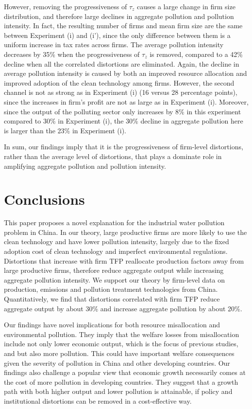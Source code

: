 \documentclass[AEJ]{AEA}
\begin{document}
However, removing the progressiveness of $\tau_z$ causes a large change in firm size distribution, and therefore large declines in aggregate pollution and pollution intensity. In fact, the resulting number of firms and mean firm size are the same between Experiment (i) and (i'), since the only difference between them is a uniform increase in tax rates across firms. The average pollution intensity decreases by 35\% when the progressiveness of $\tau_z$ is removed, compared to a 42\% decline when all the correlated distortions are eliminated. Again, the decline in average pollution intensity is caused by both an improved resource allocation and improved adoption of the clean technology among firms. However, the second channel is not as strong as in Experiment (i) (16 versus 28 percentage points), since the increases in firm's profit are not as large as in Experiment (i). Moreover, since the output of the polluting sector only increases by 8\% in this experiment compared to 30\% in Experiment (i), the 30\% decline in aggregate pollution here is larger than the 23\% in Experiment (i).

In sum, our findings imply that it is the progressiveness of firm-level distortions, rather than the average level of distortions, that plays a dominate role in amplifying aggregate pollution and pollution intensity.

\section{Conclusions}

This paper proposes a novel explanation for the industrial water pollution problem in China. In our theory, large productive firms are more likely to use the clean technology and have lower pollution intensity, largely due to the fixed adoption cost of clean technology and imperfect environmental regulations. Distortions that increase with firm TFP reallocate production factors away from large productive firms, therefore reduce aggregate output while increasing aggregate pollution intensity. We support our theory by firm-level data on production, emissions and pollution treatment technologies from China. Quantitatively, we find that distortions correlated with firm TFP reduce aggregate output by about 30\% and increase aggregate pollution by about 20\%.

Our findings have novel implications for both resource misallocation and environmental pollution. They imply that the welfare losses from misallocation include not only lower economic output, which is the focus of previous studies, and but also more pollution. This could have important welfare consequences given the severity of pollution in China and other developing countries. Our findings also challenge a popular view that economic growth necessarily comes at the cost of more pollution in developing countries. They suggest that a growth path with both higher output and lower pollution is attainable, if policy and institutional distortions can be removed in a cost-effective way.
\end{document}
